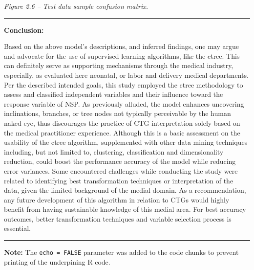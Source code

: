 \documentclass[
]{article}
\begin{document}
\emph{Figure 2.6 -- Test data sample confusion matrix.}

\begin{center}\rule{0.5\linewidth}{0.5pt}\end{center}

\textbf{Conclusion:}

Based on the above model's descriptions, and inferred findings, one may
argue and advocate for the use of supervised learning algorithms, like
the ctree. This can definitely serve as supporting mechanisms through
the medical industry, especially, as evaluated here neonatal, or labor
and delivery medical departments. Per the described intended goals, this
study employed the ctree methodology to assess and classified
independent variables and their influence toward the response variable
of NSP. As previously alluded, the model enhances uncovering
inclinations, branches, or tree nodes not typically perceivable by the
human naked-eye, thus discourages the practice of CTG interpretation
solely based on the medical practitioner experience. Although this is a
basic assessment on the usability of the ctree algorithm, supplemented
with other data mining techniques including, but not limited to,
clustering, classification and dimensionality reduction, could boost the
performance accuracy of the model while reducing error variances. Some
encountered challenges while conducting the study were related to
identifying best transformation techniques or interpretation of the
data, given the limited background of the medial domain. As a
recommendation, any future development of this algorithm in relation to
CTGs would highly benefit from having sustainable knowledge of this
medial area. For best accuracy outcomes, better transformation
techniques and variable selection process is essential.

\begin{center}\rule{0.5\linewidth}{0.5pt}\end{center}

\textbf{Note:} The \texttt{echo\ =\ FALSE} parameter was added to the
code chunks to prevent printing of the underpining R code.
\end{document}
